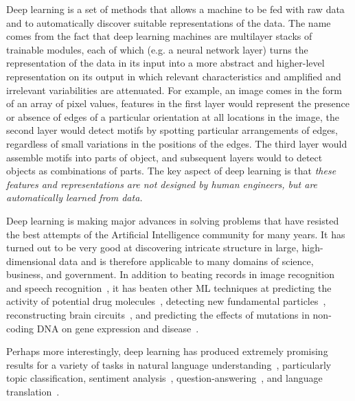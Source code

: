 \documentclass[10pts]{article}
\begin{document}
Deep learning is a set of methods that allows a machine to be fed with
raw data and to automatically discover suitable representations of the
data. The name comes from the fact that deep learning machines are
multilayer stacks of trainable modules, each of which (e.g. a neural
network layer) turns the
representation of the data in its input into a more abstract and
higher-level representation on its output in which relevant
characteristics and amplified and irrelevant variabilities are
attenuated. For example, an image comes in the form of an array of
pixel values, features in the first layer would represent the presence
or absence of edges of a particular orientation at all locations in
the image, the second layer would  detect motifs by spotting particular
arrangements of edges, regardless of small variations in the positions
of the edges.  The third layer would assemble motifs into parts of
object, and subsequent layers would to detect objects as combinations of
parts. The key aspect of deep learning is that {\em these features and
  representations are not designed by human engineers, but are
  automatically learned from data.}

Deep learning is making major advances in solving problems that have
resisted the best attempts of the Artificial Intelligence community
for many years. It has turned out to be very good at discovering
intricate structure in large, high-dimensional data and is therefore
applicable to many domains of science, business, and government. In
addition to beating records in image
recognition~\citep{Krizhevsky-2012-small,farabet-pami-13,tompson-nips-14,szegedy-2014}
and speech
recognition~\citep{Hinton-et-al-2012,Sainath-et-al-ICASSP2013}, it has
beaten other ML techniques at predicting the activity of potential
drug molecules~\citep{Dahl-et-al-arxiv2014,Ma-et-al-2015}, detecting new fundamental
particles~\citep{Ciodaro-et-al-2012,Melis-Higgs-boson-competition-2014},
reconstructing brain circuits~\citep{helmstaedter-nature-2013}, and
predicting the effects of mutations in non-coding DNA on gene
expression and disease~\citep{Keung-et-al-2014,Xiong-et-al-Frey-science2015}.

Perhaps more interestingly, deep learning has produced extremely
promising results for a variety of tasks in natural language
understanding~\citep{collobert:2011b}, particularly topic
classification, %
sentiment
analysis~\citep{Glorot+al-ICML-2011-small},
question-answering~\cite{Bordes-et-al-EMNLP2014}, and language
translation~\cite{Jean-et-al-arxiv2014,Sutskever-et-al-NIPS2014}.
\end{document}
